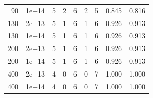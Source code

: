 \begin{table}[htbp]
\begin{tabular}{@{}rrrrrrrrr@{}}
90 & 1e+14 & 5 & 2 & 6 & 2 & 5 & 0.845 & 0.816 \\
130 & 2e+13 & 5 & 1 & 6 & 1 & 6 & 0.926 & 0.913 \\
130 & 1e+14 & 5 & 1 & 6 & 1 & 6 & 0.926 & 0.913 \\
200 & 2e+13 & 5 & 1 & 6 & 1 & 6 & 0.926 & 0.913 \\
200 & 1e+14 & 5 & 1 & 6 & 1 & 6 & 0.926 & 0.913 \\
400 & 2e+13 & 4 & 0 & 6 & 0 & 7 & 1.000 & 1.000 \\
400 & 1e+14 & 4 & 0 & 6 & 0 & 7 & 1.000 & 1.000 \\
\bottomrule
\end{tabular}
\end{table}
